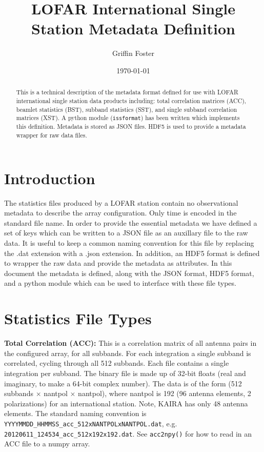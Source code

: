 \documentclass[10pt,a4paper]{article}
\begin{document}
\title{LOFAR International Single Station Metadata Definition}
\author{Griffin Foster}
\date{\today}
\maketitle

\begin{abstract}
This is a technical description of the metadata format defined for use with
LOFAR international single station data products including: total correlation
matrices (ACC), beamlet statistics (BST), subband statistics (SST), and single
subband correlation matrices (XST). A python module (\texttt{issformat}) has
been written which implements this definition. Metadata is stored as JSON files.
HDF5 is used to provide a metadata wrapper for raw data files.
\end{abstract}

\section{Introduction}
\label{sec:intro}

The statistics files produced by a LOFAR station contain no observational
metadata to describe the array configuration. Only time is encoded in the
standard file name. In order to provide the essential metadata we have defined a
set of keys which can be written to a JSON file as an auxillary file to the raw
data. It is useful to keep a common naming convention for this file by replacing
the .dat extension with a .json extension. In addition, an HDF5 format is
defined to wrapper the raw data and provide the metadata as attributes. In this
document the metadata is defined, along with the JSON format, HDF5 format, and a
python module which can be used to interface with these file types.

\section{Statistics File Types}

\noindent\textbf{Total Correlation (ACC):} This is a correlation matrix of all
antenna pairs in the configured array, for all subbands. For each integration a
single subband is correlated, cycling through all 512 subbands. Each file
contains a single integration per subband. The binary file is made up of 32-bit
floats (real and imaginary, to make a 64-bit complex number). The data is of the
form (512 subbands $\times$ nantpol $\times$ nantpol), where nantpol is 192 (96
antenna elements, 2 polarizations) for an international station. Note, KAIRA has
only 48 antenna elements. The standard naming convention is
\texttt{YYYYMMDD\_HHMMSS\_acc\_512xNANTPOLxNANTPOL.dat}, e.g.
\texttt{20120611\_124534\_acc\_512x192x192.dat}. See \texttt{acc2npy()} for how
to read in an ACC file to a numpy array.
\\
\end{document}
